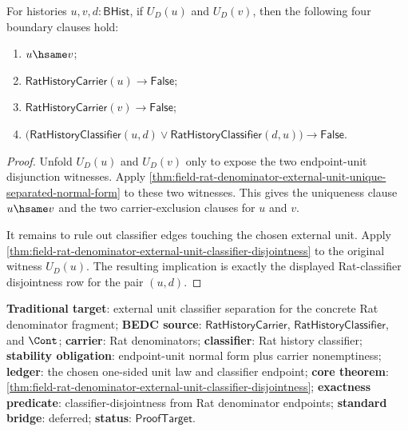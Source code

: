 \begin{theorem}
\label{thm:field-rat-denominator-external-unit-predicate-boundary-package}
For histories $u,v,d:\mathsf{BHist}$, if $U_D(u)$ and $U_D(v)$, then the
following four boundary clauses hold:
\begin{enumerate}
\item $u\hsame v$;
\item $\mathsf{RatHistoryCarrier}(u)\to\mathsf{False}$;
\item $\mathsf{RatHistoryCarrier}(v)\to\mathsf{False}$;
\item
$\bigl(\mathsf{RatHistoryClassifier}(u,d)\lor
\mathsf{RatHistoryClassifier}(d,u)\bigr)\to\mathsf{False}$.
\end{enumerate}
\end{theorem}
\begin{proof}
Unfold $U_D(u)$ and $U_D(v)$ only to expose the two endpoint-unit
disjunction witnesses. Apply
\autoref{thm:field-rat-denominator-external-unit-unique-separated-normal-form}
to these two witnesses. This gives the uniqueness clause $u\hsame v$ and the
two carrier-exclusion clauses for $u$ and $v$.

It remains to rule out classifier edges touching the chosen external unit.
Apply
\autoref{thm:field-rat-denominator-external-unit-classifier-disjointness} to
the original witness $U_D(u)$. The resulting implication is exactly the
displayed Rat-classifier disjointness row for the pair $(u,d)$.
\end{proof}

\textbf{Traditional target}: external unit classifier separation for the
concrete Rat denominator fragment; \textbf{BEDC source}:
$\mathsf{RatHistoryCarrier}$, $\mathsf{RatHistoryClassifier}$, and $\Cont$;
\textbf{carrier}: Rat denominators; \textbf{classifier}: Rat history
classifier; \textbf{stability obligation}: endpoint-unit normal form plus
carrier nonemptiness; \textbf{ledger}: the chosen one-sided unit law and
classifier endpoint; \textbf{core theorem}:
\autoref{thm:field-rat-denominator-external-unit-classifier-disjointness};
\textbf{exactness predicate}: classifier-disjointness from Rat denominator
endpoints; \textbf{standard bridge}: deferred; \textbf{status}:
$\mathsf{ProofTarget}$.
